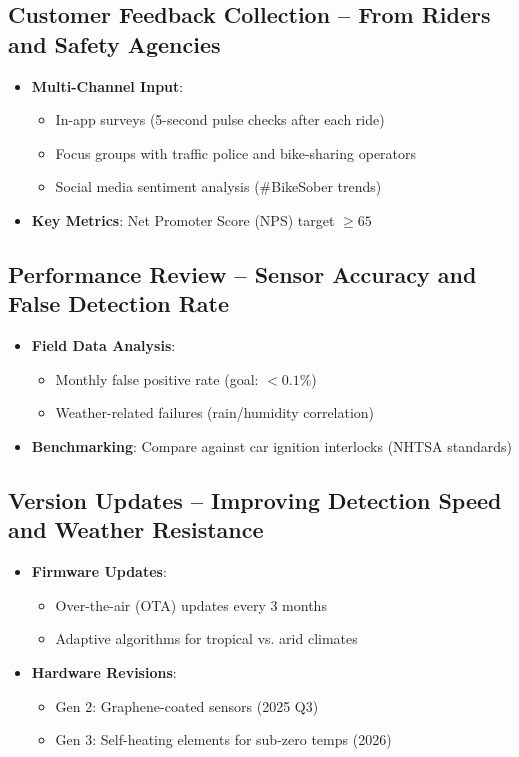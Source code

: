 \documentclass{article}
\begin{document}
\subsection{Customer Feedback Collection -- From Riders and Safety Agencies}
\begin{itemize}
    \item \textbf{Multi-Channel Input}:
    \begin{itemize}
        \item In-app surveys (5-second pulse checks after each ride)
        \item Focus groups with traffic police and bike-sharing operators
        \item Social media sentiment analysis (\#BikeSober trends)
    \end{itemize}
    \item \textbf{Key Metrics}: Net Promoter Score (NPS) target $\geq 65$
\end{itemize}

\subsection{Performance Review -- Sensor Accuracy and False Detection Rate}
\begin{itemize}
    \item \textbf{Field Data Analysis}:
    \begin{itemize}
        \item Monthly false positive rate (goal: $<0.1\%$)
        \item Weather-related failures (rain/humidity correlation)
    \end{itemize}
    \item \textbf{Benchmarking}: Compare against car ignition interlocks (NHTSA standards)
\end{itemize}

\subsection{Version Updates -- Improving Detection Speed and Weather Resistance}
\begin{itemize}
    \item \textbf{Firmware Updates}:
    \begin{itemize}
        \item Over-the-air (OTA) updates every 3 months
        \item Adaptive algorithms for tropical vs. arid climates
    \end{itemize}
    \item \textbf{Hardware Revisions}: 
    \begin{itemize}
        \item Gen 2: Graphene-coated sensors (2025 Q3)
        \item Gen 3: Self-heating elements for sub-zero temps (2026)
    \end{itemize}
\end{itemize}
\end{document}
